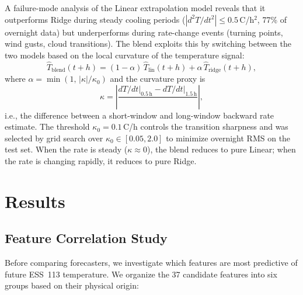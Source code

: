 \documentclass[11pt]{article}
\begin{document}
A failure-mode analysis of the Linear extrapolation model reveals that it
outperforms Ridge during steady cooling periods ($|d^2T/dt^2| \leq 0.5$\,\textdegree C/h$^2$,
77\% of overnight data) but underperforms during rate-change events (turning
points, wind gusts, cloud transitions).  The blend exploits this by switching
between the two models based on the local curvature of the temperature signal:
\begin{equation}
  \hat{T}_\mathrm{blend}(t+h) = (1-\alpha)\,\hat{T}_\mathrm{lin}(t+h)
    + \alpha\,\hat{T}_\mathrm{ridge}(t+h),
\end{equation}
where $\alpha = \min(1,\, |\kappa| / \kappa_0)$ and the curvature proxy is
\begin{equation}
  \kappa = \left|\frac{dT/dt\big|_{0.5\,\mathrm{h}}
    - dT/dt\big|_{1.5\,\mathrm{h}}}{}\right|,
\end{equation}
i.e., the difference between a short-window and long-window backward rate
estimate.  The threshold $\kappa_0 = 0.1$\,\textdegree C/h controls the
transition sharpness and was selected by grid search over
$\kappa_0 \in [0.05, 2.0]$ to minimize overnight RMS on the test set.  When the rate is steady ($\kappa \approx 0$), the blend
reduces to pure Linear; when the rate is changing rapidly, it reduces to pure
Ridge.

\section{Results}
\label{sec:results}

\subsection{Feature Correlation Study}
\label{sec:feature_study}

Before comparing forecasters, we investigate which features are most predictive
of future ESS~113 temperature.  We organize the 37 candidate features into
six groups based on their physical origin:
\end{document}
